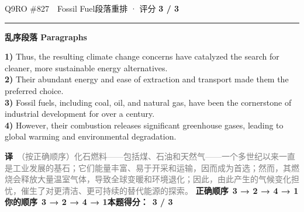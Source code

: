 \documentclass[11pt]{article}
\newcommand{\ptesub}[1]{%
  \par\needspace{2\baselineskip}\smallskip
  {\color{cAccent}\rule[-0.2ex]{3pt}{1.05em}}\hspace{6pt}%
  {\bfseries\color{cHead}#1}\par\nopagebreak\smallskip}
\newcommand{\zh}[1]{{\footnotesize\textcolor{cNote}{\textbf{译}}\ \textcolor{gray}{#1}}}
\begin{document}
\begin{qblock}{Q9\quad RO \#827\ \ Fossil Fuel}{段落重排 · 评分 \textcolor{cAccent}{\bfseries 3 / 3}}
\ptesub{乱序段落 Paragraphs}
\begin{promptbox}
\textbf{1)} Thus, the resulting climate change concerns have catalyzed the search for cleaner, more sustainable energy alternatives.\\
\textbf{2)} Their abundant energy and ease of extraction and transport made them the preferred choice.\\
\textbf{3)} Fossil fuels, including coal, oil, and natural gas, have been the cornerstone of industrial development for over a century.\\
\textbf{4)} However, their combustion releases significant greenhouse gases, leading to global warming and environmental degradation.
\end{promptbox}
\zh{（按正确顺序）化石燃料——包括煤、石油和天然气——一个多世纪以来一直是工业发展的基石；它们能量丰富、易于开采和运输，因而成为首选；然而，其燃烧会释放大量温室气体，导致全球变暖和环境退化；因此，由此产生的气候变化担忧，催生了对更清洁、更可持续的替代能源的探索。}
\smallskip
\textbf{正确顺序}\ \textcolor{cFix}{\bfseries 3 → 2 → 4 → 1}\qquad\textbf{你的顺序}\ \textcolor{cFix}{\bfseries 3 → 2 → 4 → 1}\qquad\textbf{本题得分：}\ {\color{cAccent}\bfseries 3 / 3}
\end{qblock}
\end{document}
